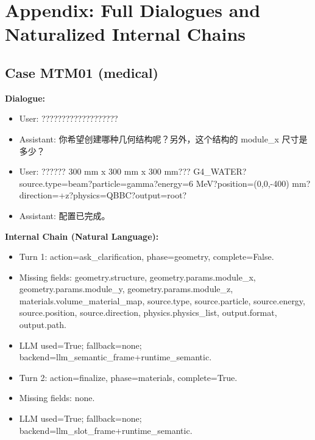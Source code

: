 \documentclass[11pt]{ctexart}
\begin{document}
\section{Appendix: Full Dialogues and Naturalized Internal Chains}
\subsection{Case MTM01 (medical)}
\textbf{Dialogue:}
\begin{itemize}
\item User: ???????????????????
\item Assistant: 你希望创建哪种几何结构呢？另外，这个结构的 module\_x 尺寸是多少？
\item User: ?????? 300 mm x 300 mm x 300 mm??? G4\_WATER?source.type=beam?particle=gamma?energy=6 MeV?position=(0,0,-400) mm?direction=+z?physics=QBBC?output=root?
\item Assistant: 配置已完成。
\end{itemize}
\textbf{Internal Chain (Natural Language):}
\begin{itemize}
\item Turn 1: action=ask\_clarification, phase=geometry, complete=False.
\item Missing fields: geometry.structure, geometry.params.module\_x, geometry.params.module\_y, geometry.params.module\_z, materials.volume\_material\_map, source.type, source.particle, source.energy, source.position, source.direction, physics.physics\_list, output.format, output.path.
\item LLM used=True; fallback=none; backend=llm\_semantic\_frame+runtime\_semantic.
\item Turn 2: action=finalize, phase=materials, complete=True.
\item Missing fields: none.
\item LLM used=True; fallback=none; backend=llm\_slot\_frame+runtime\_semantic.
\end{itemize}
\end{document}

